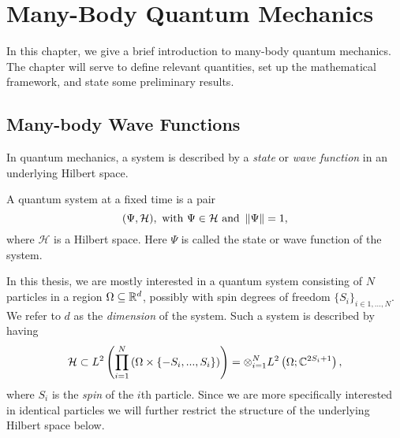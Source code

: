 
\chapter{Many-Body Quantum Mechanics} 
\label{ChapterMany-BodyQuantumMechanics}
	In this chapter, we give a brief introduction to many-body quantum mechanics. The chapter will serve to define relevant quantities, set up the mathematical framework, and state some preliminary results.

\section{Many-body Wave Functions}
	In quantum mechanics, a system is described by a \emph{state} or \emph{wave function} in an underlying Hilbert space. 
	\begin{definition}
		A quantum system at a fixed time is a pair \begin{equation*}
			(\Psi,\mathcal{H}),\text{ with } \Psi\in\mathcal{H} \text{ and } \left\lVert \Psi \right\rVert=1,
		\end{equation*}
		where $ \mathcal{H} $ is a Hilbert space. Here $ \Psi $ is called the state or wave function of the system.
	\end{definition}
	In this thesis, we are mostly interested in a quantum system consisting of $ N $ particles in a region $ \Omega\subseteq \mathbb{R}^d $, possibly with spin degrees of freedom $ \{S_i\}_{i\in{1,\ldots,N}} $. We refer to $ d $ as the \emph{dimension} of the system. Such a system is described by having $$ \mathcal{H}\subset L^2\left(\prod_{i=1}^{N}\left(\Omega\times \{-S_i,...,S_i\}\right) \right)=\otimes_{i=1}^{N}L^2\left(\Omega;\mathbb{C}^{2S_i+1}\right), $$ where $ S_i $ is the \emph{spin} of the $ i $th particle. Since we are more specifically interested in identical particles we will further restrict the structure of the underlying Hilbert space below.

